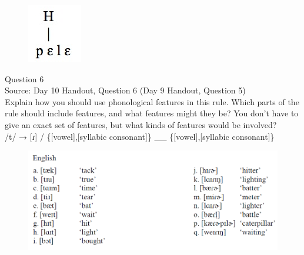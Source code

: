 \documentclass[12pt]{article}
\begin{document}
\begin{figure}[H]
\includegraphics{../images/mende_house_a.png}
\end{figure}

\newpage

{\large Question 6}\\

Source: Day 10 Handout, Question 6 (Day 9 Handout, Question 5)\\

Explain how you should use phonological features in this rule. Which parts of the rule should include features, and what features might they be? You don't have to give an exact set of features, but what kinds of features would be involved?\\

/t/ → {[ɾ]} / \{{[vowel]},{[syllabic consonant]}\} \_\_ \{{[vowel]},{[syllabic consonant]}\}

\begin{figure}[H]
\includegraphics{../images/english_t_flap.png}
\end{figure}

\newpage

\begin{center}
\textbf{{\color{red}{\HUGE END OF EXAM}}}\\

\end{center}
\newpage

\begin{center}
\textbf{{\color{blue}{\HUGE START OF EXAM\\}}}

\textbf{{\color{blue}{\HUGE Student ID: 7661\\}}}

\textbf{{\color{blue}{\HUGE 12:50 - 1:10 PM\\}}}

\end{center}
\newpage
\end{document}
